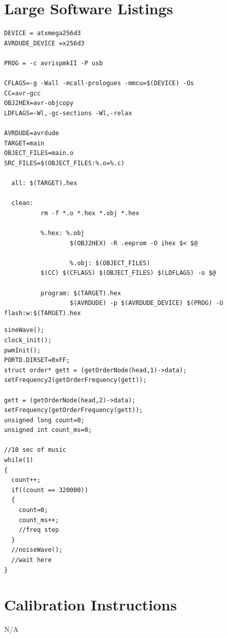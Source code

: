 \documentclass[bibtotocnumbered,abstract=on,paper=a4,fontsize=12pt,parskip=on,halfparskip=on]{scrartcl}		%
\begin{document}
\section{Large Software Listings}
\begin{lstlisting}[frame=single,caption=Avrsynth project makefile,style=makefile]
DEVICE = atxmega256d3
AVRDUDE_DEVICE =x256d3

PROG = -c avrispmkII -P usb

CFLAGS=-g -Wall -mcall-prologues -mmcu=$(DEVICE) -Os
CC=avr-gcc
OBJ2HEX=avr-objcopy
LDFLAGS=-Wl,-gc-sections -Wl,-relax

AVRDUDE=avrdude
TARGET=main
OBJECT_FILES=main.o
SRC_FILES=$(OBJECT_FILES:%.o=%.c)

  all: $(TARGET).hex

  clean:
          rm -f *.o *.hex *.obj *.hex

          %.hex: %.obj
                  $(OBJ2HEX) -R .eeprom -O ihex $< $@

                  %.obj: $(OBJECT_FILES)
          $(CC) $(CFLAGS) $(OBJECT_FILES) $(LDFLAGS) -o $@

          program: $(TARGET).hex
                  $(AVRDUDE) -p $(AVRDUDE_DEVICE) $(PROG) -U flash:w:$(TARGET).hex
\end{lstlisting}
\begin{lstlisting}[frame=single,caption=Snippet from avrsynth.c performing frequency generation from list structure,style=customc]
sineWave();
clock_init();
pwmInit();
PORTD.DIRSET=0xFF;
struct order* gett = (getOrderNode(head,1)->data);
setFrequency2(getOrderFrequency(gett));

gett = (getOrderNode(head,2)->data);
setFrequency(getOrderFrequency(gett));
unsigned long count=0;
unsigned int count_ms=0;

//10 sec of music
while(1)
{
  count++;
  if((count == 320000))
  {
    count=0;
    count_ms++;
    //freq step
  }
  //noiseWave();
  //wait here
}
\end{lstlisting}

  \clearpage
\section{Calibration Instructions}
N/A
  \clearpage
\end{document}
